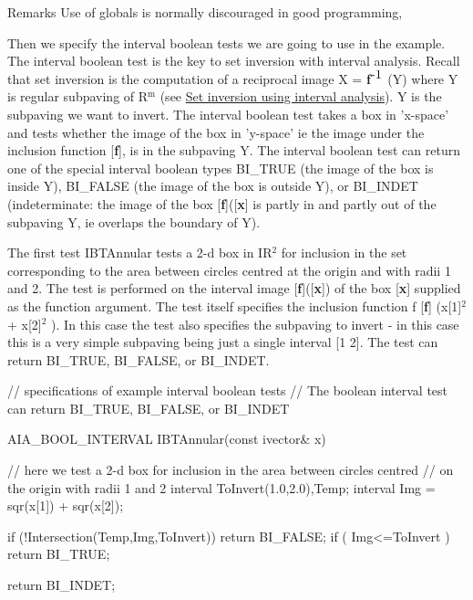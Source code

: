 \begin{DoxyRemark}{\-Remarks}
\-Use of globals is normally discouraged in good programming,
\end{DoxyRemark}
\-Then we specify the interval boolean tests we are going to use in the example. \-The interval boolean test is the key to set inversion with interval analysis. \-Recall that set inversion is the computation of a reciprocal image \-X = {\bfseries f}$^{\mbox{-\/1}}$ (\-Y) where \-Y is regular subpaving of \-R$^{\mbox{m}}$  (see \hyperlink{AIASubPavings_AIAsec_SIVIA}{\-Set inversion using interval analysis}). \-Y is the subpaving we want to invert. \-The interval boolean test takes a box in 'x-\/space' and tests whether the image of the box in 'y-\/space' ie the image under the inclusion function \mbox{[}{\bfseries f}\mbox{]}, is in the subpaving \-Y. \-The interval boolean test can return one of the special interval boolean types \-B\-I\-\_\-\-T\-R\-U\-E (the image of the box is inside \-Y), \-B\-I\-\_\-\-F\-A\-L\-S\-E (the image of the box is outside \-Y), or \-B\-I\-\_\-\-I\-N\-D\-E\-T (indeterminate\-: the image of the box \mbox{[}{\bfseries f}\mbox{]}(\mbox{[}{\bfseries x}\mbox{]} is partly in and partly out of the subpaving \-Y, ie overlaps the boundary of \-Y).

\-The first test \label{AIASubPavings_IBTAnnular}%
\hypertarget{AIASubPavings_IBTAnnular}{}%
\-I\-B\-T\-Annular tests a 2-\/d box in \-I\-R$^{\mbox{2}}$  for inclusion in the set corresponding to the area between circles centred at the origin and with radii 1 and 2. \-The test is performed on the interval image \mbox{[}{\bfseries f}\mbox{]}(\mbox{[}{\bfseries x}\mbox{]}) of the box \mbox{[}{\bfseries x}\mbox{]} supplied as the function argument. \-The test itself specifies the inclusion function f \mbox{[}{\bfseries f}\mbox{]} (x\mbox{[}1\mbox{]}$^{\mbox{2}}$  + x\mbox{[}2\mbox{]}$^{\mbox{2}}$ ). \-In this case the test also specifies the subpaving to invert -\/ in this case this is a very simple subpaving being just a single interval \mbox{[}1 2\mbox{]}. \-The test can return \-B\-I\-\_\-\-T\-R\-U\-E, \-B\-I\-\_\-\-F\-A\-L\-S\-E, or \-B\-I\-\_\-\-I\-N\-D\-E\-T.


\begin{DoxyCodeInclude}
// specifications of example interval boolean tests
// The boolean interval test can return BI_TRUE, BI_FALSE, or BI_INDET

AIA_BOOL_INTERVAL IBTAnnular(const ivector& x)
{
  // here we test a 2-d box for inclusion in the area between circles centred 
  // on the origin with radii 1 and 2
  interval ToInvert(1.0,2.0),Temp;
  interval Img = sqr(x[1]) + sqr(x[2]);

  if (!Intersection(Temp,Img,ToInvert)) return BI_FALSE;
  if ( Img<=ToInvert ) return BI_TRUE;

  return BI_INDET;
}

\end{DoxyCodeInclude}


